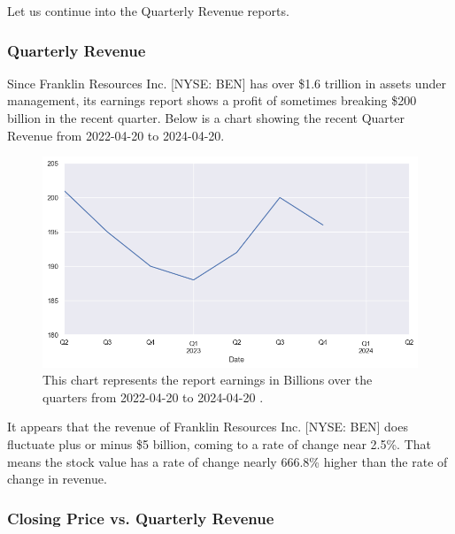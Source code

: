 \documentclass[9pt,a4paper,twoside]{tau}
\begin{document}
        Let us continue into the Quarterly Revenue reports.
            
    \subsubsection{Quarterly Revenue}
        
        Since Franklin Resources Inc. [NYSE: BEN] has over \$1.6 trillion in assets under management, its earnings report shows a profit of sometimes breaking \$200 billion in the recent quarter. Below is a chart showing the recent Quarter Revenue from 2022-04-20 to 2024-04-20.
            \begin{figure}[H]
                \centering
                \includegraphics[width=0.85\columnwidth]{Figures/EarningByQt.png}
                \caption{This chart represents the report earnings in Billions over the quarters from 2022-04-20 to 2024-04-20 \cite{alpha-vantage-2024}.}
                \label{fig:figure}
            \end{figure}
        
        It appears that the revenue of Franklin Resources Inc. [NYSE: BEN] does fluctuate plus or minus \$5 billion, coming to a rate of change near 2.5\%. That means the stock value has a rate of change nearly 666.8\% higher than the rate of change in revenue. 
            
    \subsubsection{Closing Price vs. Quarterly Revenue}   
        
\end{document}
